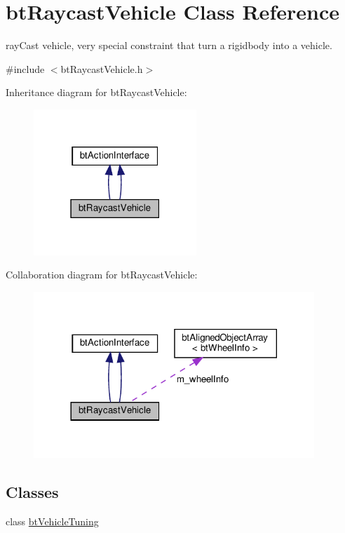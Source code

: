 \hypertarget{classbtRaycastVehicle}{}\section{bt\+Raycast\+Vehicle Class Reference}
\label{classbtRaycastVehicle}


ray\+Cast vehicle, very special constraint that turn a rigidbody into a vehicle.  




{\ttfamily \#include $<$bt\+Raycast\+Vehicle.\+h$>$}



Inheritance diagram for bt\+Raycast\+Vehicle\+:
\nopagebreak
\begin{figure}[H]
\begin{center}
\leavevmode
\includegraphics[width=174pt]{classbtRaycastVehicle__inherit__graph}
\end{center}
\end{figure}


Collaboration diagram for bt\+Raycast\+Vehicle\+:
\nopagebreak
\begin{figure}[H]
\begin{center}
\leavevmode
\includegraphics[width=300pt]{classbtRaycastVehicle__coll__graph}
\end{center}
\end{figure}
\subsection*{Classes}
\begin{DoxyCompactItemize}
\item 
class \hyperlink{classbtRaycastVehicle_1_1btVehicleTuning}{bt\+Vehicle\+Tuning}
\end{DoxyCompactItemize}
